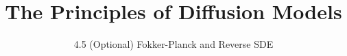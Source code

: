 
\title{The Principles of Diffusion Models}
\subtitle{4.5 (Optional) Fokker-Planck and Reverse SDE}


\begin{frame}
    \titlepage
\end{frame}


